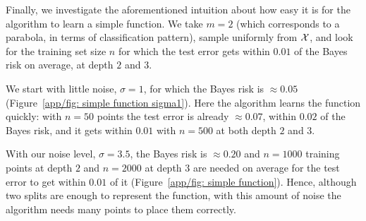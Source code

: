 Finally, we investigate the aforementioned intuition about how easy it is for the algorithm to learn a simple function. We take $m=2$ (which corresponds to a parabola, in terms of classification pattern), sample uniformly from $\mathcal{X}$, and look for the training set size $n$ for which the test error gets within $0.01$ of the Bayes risk on average, at depth $2$ and $3$.

We start with little noise, $\sigma = 1$, for which the Bayes risk is $\approx 0.05$ (Figure~\ref{app/fig: simple function sigma1}). Here the algorithm learns the function quickly: with $n = 50$ points the test error is already $\approx 0.07$, within $0.02$ of the Bayes risk, and it gets within $0.01$ with $n = 500$ at both depth $2$ and $3$.

With our noise level, $\sigma = 3.5$, the Bayes risk is $\approx 0.20$ and $n = 1000$ training points at depth $2$ and $n = 2000$ at depth $3$ are needed on average for the test error to get within $0.01$ of it (Figure~\ref{app/fig: simple function}). Hence, although two splits are enough to represent the function, with this amount of noise the algorithm needs many points to place them correctly.



